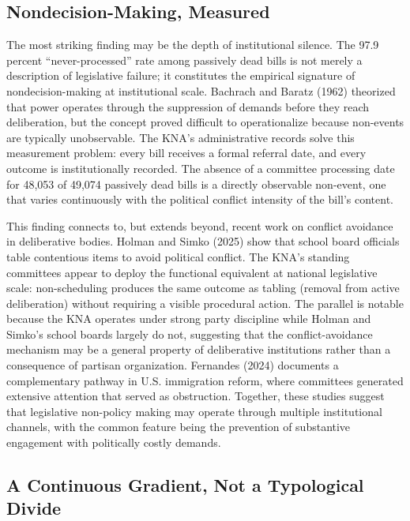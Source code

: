 \documentclass[11pt]{article}
\begin{document}
\subsection*{Nondecision-Making, Measured}

The most striking finding may be the depth of institutional silence. The 97.9 percent ``never-processed'' rate among passively dead bills is not merely a description of legislative failure; it constitutes the empirical signature of nondecision-making at institutional scale. Bachrach and Baratz (1962) theorized that power operates through the suppression of demands before they reach deliberation, but the concept proved difficult to operationalize because non-events are typically unobservable. The KNA's administrative records solve this measurement problem: every bill receives a formal referral date, and every outcome is institutionally recorded. The absence of a committee processing date for 48,053 of 49,074 passively dead bills is a directly observable non-event, one that varies continuously with the political conflict intensity of the bill's content.

This finding connects to, but extends beyond, recent work on conflict avoidance in deliberative bodies. Holman and Simko (2025) show that school board officials table contentious items to avoid political conflict. The KNA's standing committees appear to deploy the functional equivalent at national legislative scale: non-scheduling produces the same outcome as tabling (removal from active deliberation) without requiring a visible procedural action. The parallel is notable because the KNA operates under strong party discipline while Holman and Simko's school boards largely do not, suggesting that the conflict-avoidance mechanism may be a general property of deliberative institutions rather than a consequence of partisan organization. Fernandes (2024) documents a complementary pathway in U.S. immigration reform, where committees generated extensive attention that served as obstruction. Together, these studies suggest that legislative non-policy making may operate through multiple institutional channels, with the common feature being the prevention of substantive engagement with politically costly demands.

\subsection*{A Continuous Gradient, Not a Typological Divide}
\end{document}

